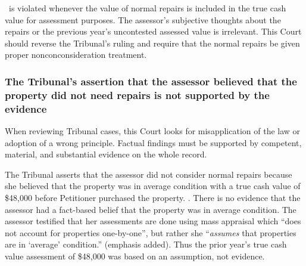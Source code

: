 \documentclass[12pt,\documentclassflag]{michiganCourtOfAppealsBrief}
\begin{document}
\mathieuGast\ is violated whenever the value of normal repairs is included in the true cash value for assessment purposes. The assessor's subjective thoughts about the repairs or the previous year's uncontested assessed value is irrelevant.
This Court should reverse the Tribunal's ruling and require that the normal repairs be given proper nonconconsideration treatment.




\subsubsection{The Tribunal's assertion that the assessor believed that the property did not need repairs is not supported by the evidence}
When reviewing Tribunal cases, this Court looks for misapplication of the law or adoption of a wrong principle. Factual findings must be supported by competent, material, and substantial evidence on the whole record. 

The Tribunal asserts that the assessor did not consider normal repairs because she believed that the property was in average condition with a true cash value of \$48,000 before Petitioner purchased the property. \reconsiderationDenied[2]. There is no evidence that the assessor had a fact-based belief that the property was in average condition. The assessor testified that her assessments are done using mass appraisal which ``does not account for properties one-by-one'', but rather she ``{\em assumes} that properties are in `average' condition.'' \foj[4] (emphasis added). Thus the prior year's true cash value assessment of \$48,000 was based on an assumption, not evidence.
\end{document}
